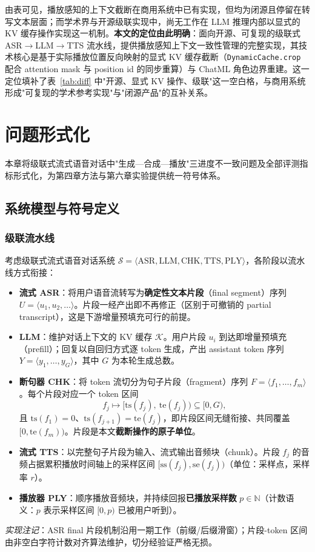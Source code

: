 \documentclass[conference]{IEEEtran}
\theoremstyle{definition}
\begin{document}
由表可见，播放感知的上下文截断在商用系统中已有实现，但均为闭源且停留在转写文本层面；而学术界与开源级联实现中，尚无工作在 LLM 推理内部以显式的 KV 缓存操作实现这一机制。\textbf{本文的定位由此明确}：面向开源、可复现的级联式 ASR$\rightarrow$LLM$\rightarrow$TTS 流水线，提供播放感知上下文一致性管理的完整实现，其技术核心是基于实际播放位置反向映射的显式 KV 缓存截断（\texttt{DynamicCache.crop} 配合 attention mask 与 position id 的同步重算）与 ChatML 角色边界重建。这一定位填补了表~\ref{tab:diff} 中"开源、显式 KV 操作、级联"这一空白格，与商用系统形成"可复现的学术参考实现"与"闭源产品"的互补关系。

\section{问题形式化}\label{sec:form}
本章将级联式流式语音对话中"生成—合成—播放"三进度不一致问题及全部评测指标形式化，为第四章方法与第六章实验提供统一符号体系。

\subsection{系统模型与符号定义}

\subsubsection{级联流水线}
考虑级联式流式语音对话系统 $\mathcal{S} = \langle \mathrm{ASR}, \mathrm{LLM}, \mathrm{CHK}, \mathrm{TTS}, \mathrm{PLY} \rangle$，各阶段以流水线方式衔接：
\begin{itemize}
  \item \textbf{流式 ASR}：将用户语音流转写为\textbf{确定性文本片段}（final segment）序列 $U = \langle u_1, u_2, \dots \rangle$。片段一经产出即不再修正（区别于可撤销的 partial transcript），这是下游增量预填充可行的前提。
  \item \textbf{LLM}：维护对话上下文的 KV 缓存 $\mathcal{K}$。用户片段 $u_i$ 到达即增量预填充（prefill）；回复以自回归方式逐 token 生成，产出 assistant token 序列 $Y = \langle y_1, \dots, y_G \rangle$，其中 $G$ 为本轮生成总数。
  \item \textbf{断句器 CHK}：将 token 流切分为句子片段（fragment）序列 $F = \langle f_1, \dots, f_m \rangle$。每个片段对应一个 token 区间
  $$f_j \mapsto [\mathrm{ts}(f_j),\ \mathrm{te}(f_j)) \subseteq [0, G),$$
  且 $\mathrm{ts}(f_1)=0$、$\mathrm{ts}(f_{j+1})=\mathrm{te}(f_j)$，即片段区间无缝衔接、共同覆盖 $[0, \mathrm{te}(f_m))$。片段是本文\textbf{截断操作的原子单位}。
  \item \textbf{流式 TTS}：以完整句子片段为输入、流式输出音频块（chunk）。片段 $f_j$ 的音频占据累积播放时间轴上的采样区间 $[\mathrm{ss}(f_j), \mathrm{se}(f_j))$（单位：采样点，采样率 $r$）。
  \item \textbf{播放器 PLY}：顺序播放音频块，并持续回报\textbf{已播放采样数} $p \in \mathbb{N}$（计数语义：$p$ 表示采样区间 $[0, p)$ 已被用户听到）。
\end{itemize}
\emph{实现注记}：ASR final 片段机制沿用一期工作（前缀/后缀滑窗）；片段-token 区间由非空白字符计数对齐算法维护，切分经验证严格无损。
\end{document}
